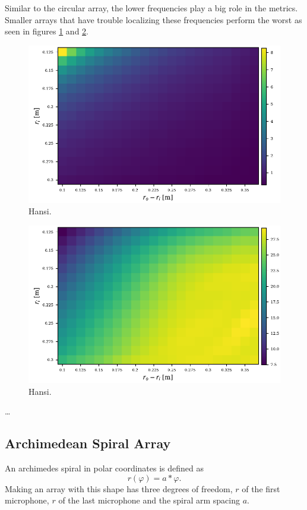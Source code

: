 Similar to the circular array, the lower frequencies play a big role in the metrics.
Smaller arrays that have trouble localizing these frequencies perform the worst as seen
in figures \ref*{aev:fig:FancyArea} and \ref*{aev:fig:FancyPap}.

\begin{figure}
	\centering
	\includegraphics[]{images/5_array_evaluation/fancy_area.pdf}
	\caption{Hansi.}
	\label{aev:fig:FancyArea}
\end{figure}

\begin{figure}
	\centering
	\includegraphics[]{images/5_array_evaluation/fancy_pap.pdf}
	\caption{Hansi.}
	\label{aev:fig:FancyPap}
\end{figure}


\dots
\subsection{Archimedean Spiral Array}
An archimedes spiral in polar coordinates is defined as
\begin{equation}
	r(\varphi) = a * \varphi.
\end{equation}
Making an array with this shape has three degrees of freedom,
$r$ of the first microphone, $r$ of the last microphone and the 
spiral arm spacing $a$. 



